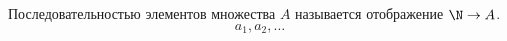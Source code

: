 
     Последовательностью элементов множества $A$ называется отображение $\N\to A$.
     \[
        a_1,a_2,\ldots
     \]
 